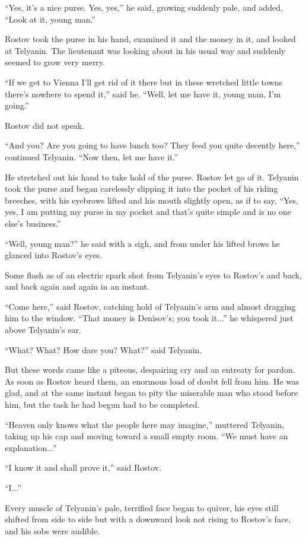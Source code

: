 ``Yes, it's a nice purse. Yes, yes,'' he said, growing suddenly
pale, and added, ``Look at it, young man.''

Rostov took the purse in his hand, examined it and the money in
it, and looked at Telyanin. The lieutenant was looking about in
his usual way and suddenly seemed to grow very merry.

``If we get to Vienna I'll get rid of it there but in these
wretched little towns there's nowhere to spend it,'' said
he. ``Well, let me have it, young man, I'm going.''

Rostov did not speak.

``And you? Are you going to have lunch too? They feed you quite
decently here,'' continued Telyanin. ``Now then, let me have
it.''

He stretched out his hand to take hold of the purse. Rostov let
go of it. Telyanin took the purse and began carelessly slipping
it into the pocket of his riding breeches, with his eyebrows
lifted and his mouth slightly open, as if to say, ``Yes, yes, I
am putting my purse in my pocket and that's quite simple and is
no one else's business.''

``Well, young man?'' he said with a sigh, and from under his
lifted brows he glanced into Rostov's eyes.

Some flash as of an electric spark shot from Telyanin's eyes to
Rostov's and back, and back again and again in an instant.

``Come here,'' said Rostov, catching hold of Telyanin's arm and
almost dragging him to the window. ``That money is Denisov's; you
took it...'' he whispered just above Telyanin's ear.

``What? What? How dare you? What?'' said Telyanin.

But these words came like a piteous, despairing cry and an
entreaty for pardon. As soon as Rostov heard them, an enormous
load of doubt fell from him. He was glad, and at the same instant
began to pity the miserable man who stood before him, but the
task he had begun had to be completed.

``Heaven only knows what the people here may imagine,'' muttered
Telyanin, taking up his cap and moving toward a small empty
room. ``We must have an explanation...''

``I know it and shall prove it,'' said Rostov.

``I...''

Every muscle of Telyanin's pale, terrified face began to quiver,
his eyes still shifted from side to side but with a downward look
not rising to Rostov's face, and his sobs were audible.

